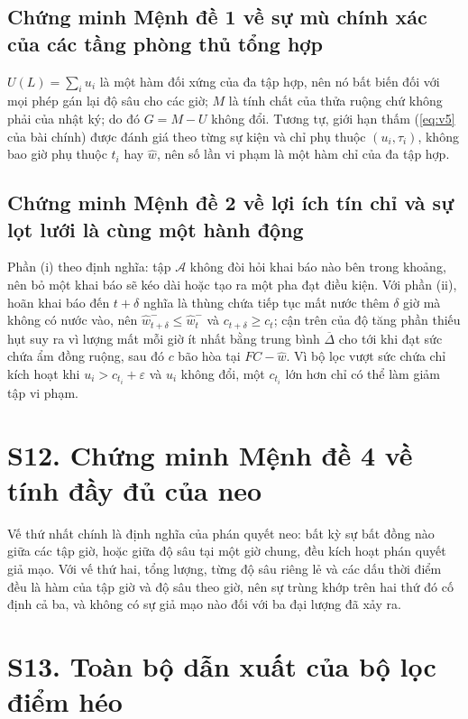 \subsection*{Chứng minh Mệnh đề 1 về sự mù chính xác của các tầng phòng thủ tổng hợp}

$U(L)=\sum_i u_i$ là một hàm đối xứng của đa tập hợp, nên nó bất biến đối với mọi phép gán
lại độ sâu cho các giờ; $M$ là tính chất của thửa ruộng chứ không phải của nhật ký; do đó
$G=M-U$ không đổi. Tương tự, giới hạn thấm (\eqref{eq:v5} của bài chính) được đánh giá
theo từng sự kiện và chỉ phụ thuộc $(u_i,\tau_i)$, không bao giờ phụ thuộc $t_i$ hay
$\hat w$, nên số lần vi phạm là một hàm chỉ của đa tập hợp.

\subsection*{Chứng minh Mệnh đề 2 về lợi ích tín chỉ và sự lọt lưới là cùng một hành động}

Phần (i) theo định nghĩa: tập $\mathcal{A}$ không đòi hỏi khai báo nào bên trong khoảng, nên
bỏ một khai báo sẽ kéo dài hoặc tạo ra một pha đạt điều kiện. Với phần (ii), hoãn khai báo
đến $t+\delta$ nghĩa là thùng chứa tiếp tục mất nước thêm $\delta$ giờ mà không có nước vào,
nên $\hat w_{t+\delta}^{-}\le\hat w_t^{-}$ và $c_{t+\delta}\ge c_t$; cận trên của độ tăng phần
thiếu hụt suy ra vì lượng mất mỗi giờ ít nhất bằng trung bình $\overline{\Delta}$ cho tới khi
đạt sức chứa ẩm đồng ruộng, sau đó $c$ bão hòa tại $FC-\hat w$. Vì bộ lọc vượt sức chứa chỉ
kích hoạt khi $u_i>c_{t_i}+\varepsilon$ và $u_i$ không đổi, một $c_{t_i}$ lớn hơn chỉ có thể
làm giảm tập vi phạm.

\section*{S12. Chứng minh Mệnh đề 4 về tính đầy đủ của neo}

Vế thứ nhất chính là định nghĩa của phán quyết neo: bất kỳ sự bất đồng nào giữa các tập giờ,
hoặc giữa độ sâu tại một giờ chung, đều kích hoạt phán quyết giả mạo. Với vế thứ hai, tổng
lượng, từng độ sâu riêng lẻ và các dấu thời điểm đều là hàm của tập giờ và độ sâu theo giờ,
nên sự trùng khớp trên hai thứ đó cố định cả ba, và không có sự giả mạo nào đối với ba đại
lượng đã xảy ra.

\section*{S13. Toàn bộ dẫn xuất của bộ lọc điểm héo}

